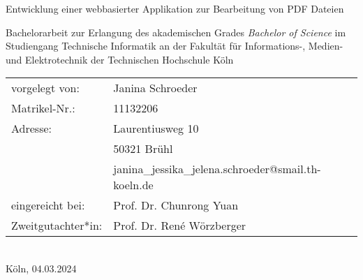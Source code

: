 \begin{titlepage}
%
%
\begin{center}
\end{center}
%
\vfill
%
\begin{huge}
Entwicklung einer webbasierter Applikation zur Bearbeitung von PDF Dateien\\[10mm]
\end{huge}
%
Bachelorarbeit zur Erlangung des akademischen Grades\newline
\emph{Bachelor of Science}\newline
im Studiengang Technische Informatik\newline
an der Fakultät für Informations-, Medien- und Elektrotechnik\newline
der Technischen Hochschule Köln
%
\vfill
%
\begin{tabular}{@{}ll}
vorgelegt von: & Janina Schroeder\\
Matrikel-Nr.:  & 11132206\\
Adresse:       & Laurentiusweg 10\\
                & 50321 Brühl\\
                & janina\_jessika\_jelena.schroeder@smail.th-koeln.de\\[5mm]
eingereicht bei:   & Prof. Dr. Chunrong Yuan\\
Zweitgutachter*in: & Prof. Dr. René Wörzberger
\end{tabular}	
%
\\[10mm]
%
Köln, 04.03.2024%
%
\rmfamily%
%
\end{titlepage}